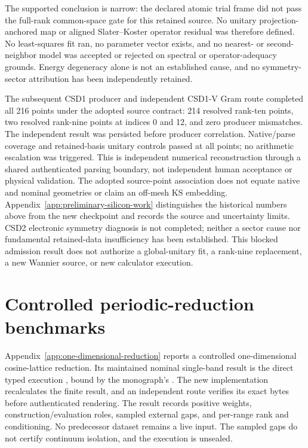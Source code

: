 The supported conclusion is narrow: the declared atomic trial frame did not
pass the full-rank common-space gate for this retained source. No unitary
projection-anchored map or aligned Slater--Koster operator residual was therefore
defined. No least-squares fit ran, no parameter vector exists, and no nearest-
or second-neighbor model was accepted or rejected on spectral or
operator-adequacy grounds. Energy degeneracy alone is not an established cause,
and no symmetry-sector attribution has been independently retained.

The subsequent CSD1 producer and independent CSD1-V Gram route completed all
216 points under the adopted source contract: 214 resolved rank-ten points,
two resolved rank-nine points at indices 0 and 12, and zero producer mismatches.
The independent result was persisted before producer correlation. Native/parse
coverage and retained-basis unitary controls passed at all points; no arithmetic
escalation was triggered. This is independent numerical reconstruction through
a shared authenticated parsing boundary, not independent human acceptance or
physical validation. The adopted source-point association does not equate
native and nominal geometries or claim an off-mesh KS embedding.
Appendix~\ref{app:preliminary-silicon-work} distinguishes the historical numbers
above from the new checkpoint and records the source and uncertainty limits.
CSD2 electronic symmetry diagnosis is not completed; neither a sector cause nor
fundamental retained-data insufficiency has been established. This blocked admission
result does not authorize a global-unitary fit, a rank-nine replacement, a new
Wannier source, or new calculator execution.

\section{Controlled periodic-reduction benchmarks}


Appendix~\ref{app:one-dimensional-reduction} reports a controlled
one-dimensional cosine-lattice reduction. Its maintained nominal single-band result is
the direct typed execution
, bound by the
monograph's . The new implementation recalculates the
finite result, and an independent route verifies its exact bytes before authenticated
rendering. The result records positive weights, construction/evaluation roles, sampled
external gaps, and per-range rank and conditioning. No predecessor dataset remains a
live input. The sampled gaps do not certify continuum isolation, and the execution is
unsealed.


